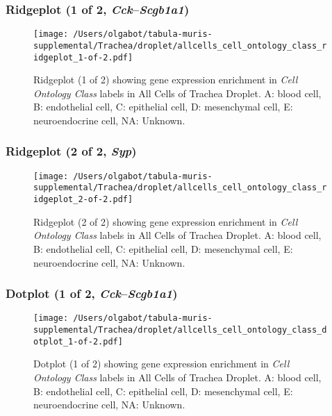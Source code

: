 \clearpage

\subsubsection{Ridgeplot (1 of 2, \emph{Cck}--\emph{Scgb1a1})}
\begin{figure}[h]
\centering
\texttt{[image: /Users/olgabot/tabula-muris-supplemental/Trachea/droplet/allcells\_cell\_ontology\_class\_ridgeplot\_1-of-2.pdf]}

\caption{ Ridgeplot (1 of 2)  showing gene expression enrichment in \emph{Cell Ontology Class} labels in All Cells of Trachea Droplet. A: blood cell, B: endothelial cell, C: epithelial cell, D: mesenchymal cell, E: neuroendocrine cell, NA: Unknown.}
\end{figure}


\clearpage

\subsubsection{Ridgeplot (2 of 2, \emph{Syp})}
\begin{figure}[h]
\centering
\texttt{[image: /Users/olgabot/tabula-muris-supplemental/Trachea/droplet/allcells\_cell\_ontology\_class\_ridgeplot\_2-of-2.pdf]}

\caption{ Ridgeplot (2 of 2)  showing gene expression enrichment in \emph{Cell Ontology Class} labels in All Cells of Trachea Droplet. A: blood cell, B: endothelial cell, C: epithelial cell, D: mesenchymal cell, E: neuroendocrine cell, NA: Unknown.}
\end{figure}


\clearpage

\subsubsection{Dotplot (1 of 2, \emph{Cck}--\emph{Scgb1a1})}
\begin{figure}[h]
\centering
\texttt{[image: /Users/olgabot/tabula-muris-supplemental/Trachea/droplet/allcells\_cell\_ontology\_class\_dotplot\_1-of-2.pdf]}

\caption{ Dotplot (1 of 2)  showing gene expression enrichment in \emph{Cell Ontology Class} labels in All Cells of Trachea Droplet. A: blood cell, B: endothelial cell, C: epithelial cell, D: mesenchymal cell, E: neuroendocrine cell, NA: Unknown.}
\end{figure}


